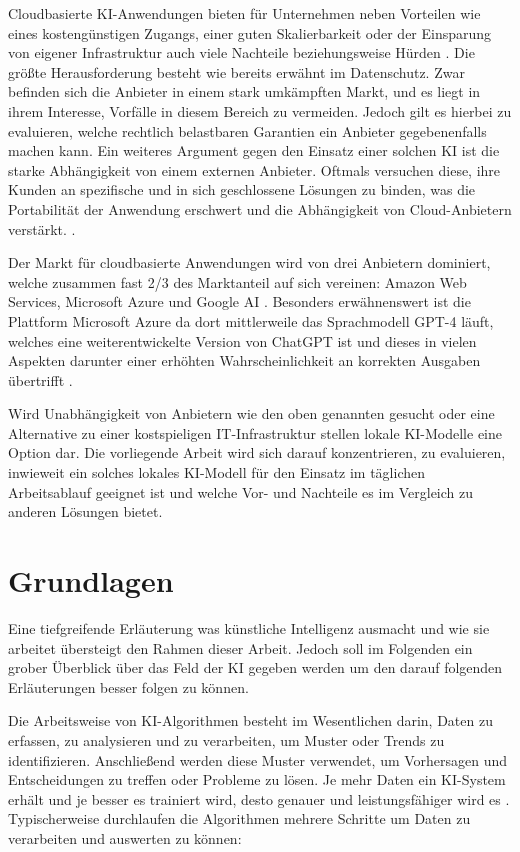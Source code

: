 \documentclass[11pt,a4paper]{report}
\begin{document}
\newpage
\noindent
Cloudbasierte KI-Anwendungen bieten für Unternehmen neben Vorteilen wie eines kostengünstigen Zugangs, einer guten Skalierbarkeit oder der Einsparung von eigener Infrastruktur auch viele Nachteile beziehungsweise Hürden \cite{cloudbased_ki}. Die größte Herausforderung besteht wie bereits erwähnt im Datenschutz. Zwar befinden sich die Anbieter in einem stark umkämpften Markt, und es liegt in ihrem Interesse, Vorfälle in diesem Bereich zu vermeiden. Jedoch gilt es hierbei zu evaluieren, welche rechtlich belastbaren Garantien ein Anbieter gegebenenfalls machen kann. Ein weiteres Argument gegen den Einsatz einer solchen KI ist die starke Abhängigkeit von einem externen Anbieter. Oftmals versuchen diese, ihre Kunden an spezifische und in sich geschlossene Lösungen zu binden, was die Portabilität der Anwendung erschwert und die Abhängigkeit von Cloud-Anbietern verstärkt. \cite{cloudbased_ki}.

\noindent
Der Markt für cloudbasierte Anwendungen wird von drei Anbietern dominiert, welche zusammen fast 2/3 des Marktanteil auf sich vereinen: Amazon Web Services, Microsoft Azure und Google AI \cite{cloudbased_marked}. Besonders erwähnenswert ist die Plattform Microsoft Azure da dort mittlerweile das Sprachmodell GPT-4 läuft, welches eine weiterentwickelte Version von ChatGPT ist und dieses in vielen Aspekten darunter einer erhöhten Wahrscheinlichkeit an korrekten Ausgaben übertrifft \cite{GPT-4}.

\noindent
Wird Unabhängigkeit von Anbietern wie den oben genannten gesucht oder eine Alternative zu einer kostspieligen IT-Infrastruktur stellen lokale KI-Modelle eine Option dar. Die vorliegende Arbeit wird sich darauf konzentrieren, zu evaluieren, inwieweit ein solches lokales KI-Modell für den Einsatz im täglichen Arbeitsablauf geeignet ist und welche Vor- und Nachteile es im Vergleich zu anderen Lösungen bietet. 


\section{Grundlagen}\label{sec:LLM_Basis}

Eine tiefgreifende Erläuterung was künstliche Intelligenz ausmacht und wie sie arbeitet übersteigt den Rahmen dieser Arbeit. Jedoch soll im Folgenden ein grober Überblick über das Feld der KI gegeben werden um den darauf folgenden Erläuterungen besser folgen zu können.

\noindent
Die Arbeitsweise von KI-Algorithmen besteht im Wesentlichen darin, Daten zu erfassen, zu analysieren und zu verarbeiten, um Muster oder Trends zu identifizieren. Anschließend werden diese Muster verwendet, um Vorhersagen und Entscheidungen zu treffen oder Probleme zu lösen. Je mehr Daten ein KI-System erhält und je besser es trainiert wird, desto genauer und leistungsfähiger wird es \cite{chollet}. Typischerweise durchlaufen die Algorithmen mehrere Schritte um Daten zu verarbeiten und auswerten zu können:
\end{document}
